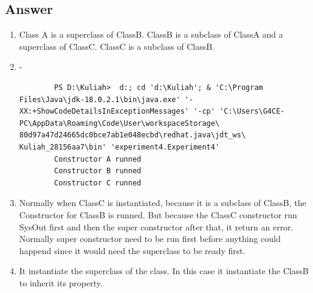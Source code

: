 \documentclass[12pt,titlepage]{article}
\begin{document}
\newpage
\subsection{Answer}
\begin{enumerate}
    \item Class A is a superclass of ClassB. ClassB is a subclass of ClassA and a superclass of ClassC. ClassC is a subclass of ClassB.
    \item -
    \begin{verbatim}
        PS D:\Kuliah>  d:; cd 'd:\Kuliah'; & 'C:\Program Files\Java\jdk-18.0.2.1\bin\java.exe' '-XX:+ShowCodeDetailsInExceptionMessages' '-cp' 'C:\Users\G4CE-PC\AppData\Roaming\Code\User\workspaceStorage\ 80d97a47d24665dc0bce7ab1e048ecbd\redhat.java\jdt_ws\ Kuliah_28156aa7\bin' 'experiment4.Experiment4' 
        Constructor A runned
        Constructor B runned
        Constructor C runned
    \end{verbatim}
    \item Normally when ClassC is instantiated, because it is a subclass of ClassB, the Constructor for ClassB is runned. But because the ClassC constructor run SysOut first and then the super constructor after that, it return an error. Normally super constructor need to be run first before anything could happend since it would need the superclass to be ready first.
    \item It instantiate the superclass of the class. In this case it instantiate the ClassB to inherit its property.
\end{enumerate}

\newpage
\end{document}
